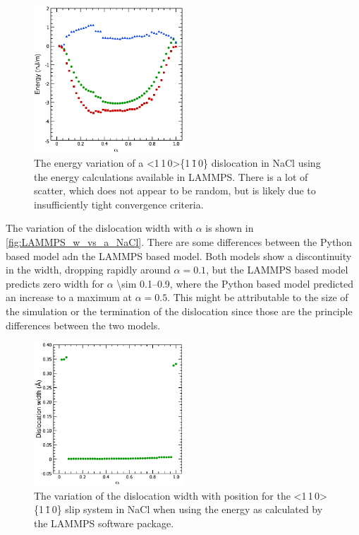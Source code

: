 \begin{figure}
\centering
\includegraphics[width=0.5\textwidth]{NaCl_110_110_U_vs_alpha_LAMMPS}
\caption[The energy changes of a dislocation in NaCl via LAMMPS.]{The energy variation of a <1\,1\,0>\{1\,\={1}\,0\} dislocation in NaCl using the energy calculations available in LAMMPS. There is a lot of scatter, which does not appear to be random, but is likely due to insufficiently tight convergence criteria.\label{fig:NaCl_110_110_U_vs_a_LAMMPS}}
\end{figure}

The variation of the dislocation width with $\alpha$ is shown in \autoref{fig:LAMMPS_w_vs_a_NaCl}. There are some differences between the Python based model adn the LAMMPS based model. Both models show a discontinuity in the width, dropping rapidly around $\alpha=0.1$, but the LAMMPS based model predicts zero width for $\alpha$ \numrange{\sim 0.1}{ 0.9}, where the Python based model predicted an increase to a maximum at $\alpha=0.5$. This might be attributable to the size of the simulation or the termination of the dislocation since those are the principle differences between the two models.

\begin{figure}
\centering
\includegraphics[width=0.5\textwidth]{NaCl_110_110_w_vs_a_LAMMPS}
\captionsetup{width=0.6\textwidth}
\caption[The variation of the dislocation width for the hard slip system in NaCl.]{The variation of the dislocation width with position for the <1\,1\,0>\{1\,\={1}\,0\} slip system in NaCl when using the energy as calculated by the LAMMPS software package.\label{fig:LAMMPS_w_vs_a_NaCl}}
\end{figure}


